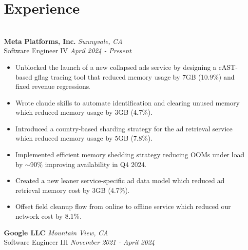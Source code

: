 \documentclass{resume}
\author{https://aravindvasudev.github.io/}{Aravind Vasudevan}
\begin{document}
\maketitle
\section*{Experience}
\titlerule[0.2pt]
\noindent
\\
\textbf{Meta Platforms, Inc.} \hfill \textit{Sunnyvale, CA} \\
{\small Software Engineer IV} \hfill \textit{\small April 2024 - Present}
\begin{itemize}
  \item Unblocked the launch of a new collapsed ads service by designing a cAST-based gflag tracing tool that reduced memory usage by 7GB (10.9\%) and fixed revenue regressions.
  \item Wrote claude skills to automate identification and clearing unused memory which reduced memory usage by 3GB (4.7\%).
  \item Introduced a country-based sharding strategy for the ad retrieval service which reduced memory usage by 5GB (7.8\%).
  \item Implemented efficient memory shedding strategy reducing OOMs under load by $\sim$90\% improving availability in Q4 2024.
  \item Created a new leaner service-specific ad data model which reduced ad retrieval memory cost by 3GB (4.7\%).
  \item Offset field cleanup flow from online to offline service which reduced our network cost by 8.1\%.
\end{itemize}
\textbf{Google LLC} \hfill \textit{Mountain View, CA} \\
{\small Software Engineer III} \hfill \textit{\small November 2021 - April 2024}
\end{document}
